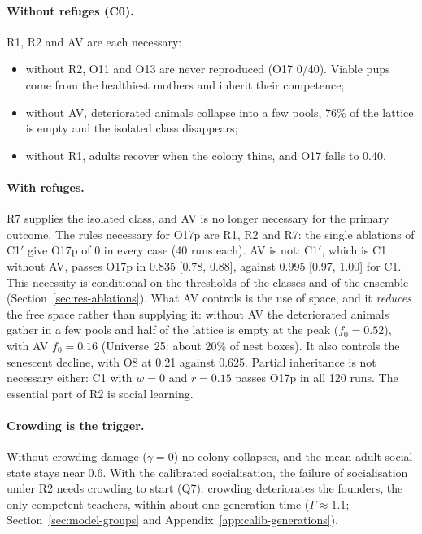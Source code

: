 \paragraph{Without refuges (\textsf{C0}).} R1, R2 and AV are each necessary:
\begin{itemize}
  \item without R2, O11 and O13 are never reproduced (O17 0/40). Viable pups come from the healthiest
    mothers and inherit their competence;
  \item without AV, deteriorated animals collapse into a few pools, 76\% of the lattice is empty and the
    isolated class disappears;
  \item without R1, adults recover when the colony thins, and O17 falls to 0.40.
\end{itemize}

\paragraph{With refuges.} R7 supplies the isolated class, and AV is no longer necessary for the primary
outcome. The rules necessary for O17p are R1, R2 and R7: the single ablations of \textsf{C1}$'$ give O17p of 0 in
every case (40 runs each). AV is not: \textsf{C1}$'$, which is \textsf{C1} without AV, passes O17p in
0.835 [0.78, 0.88], against 0.995 [0.97, 1.00] for \textsf{C1}. This necessity is conditional on the thresholds of
the classes and of the ensemble (Section~\ref{sec:res-ablations}). What AV controls is the use of space, and it
\emph{reduces} the free space rather than supplying it: without AV the deteriorated animals gather in a few pools
and half of the lattice is empty at the peak ($f_0=0.52$), with AV $f_0=0.16$ (Universe~25: about 20\% of nest
boxes). It also controls the senescent decline, with O8 at 0.21 against 0.625. Partial inheritance is not necessary either:
\textsf{C1} with $w=0$ and $r=0.15$ passes O17p in all 120 runs. The essential part of R2 is social learning.

\paragraph{Crowding is the trigger.} Without crowding damage ($\gamma=0$) no colony collapses, and the mean
adult social state stays near 0.6. With the calibrated socialisation, the failure of socialisation under R2 needs
crowding to start (Q7): crowding deteriorates the founders, the only competent teachers, within about one
generation time ($\Gamma\approx1.1$; Section~\ref{sec:model-groups} and Appendix~\ref{app:calib-generations}).

